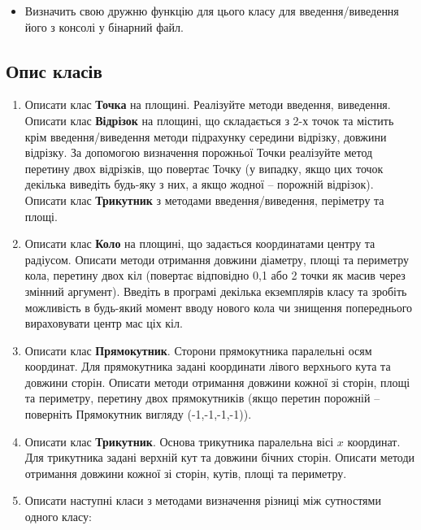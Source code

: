 \documentclass[]{article}
\begin{document}
\begin{itemize}
\item
  Визначить свою дружню функцію для цього класу для введення/виведення
  його з консолі у бінарний файл.
\end{itemize}


\subsection{ Опис класів}


\begin{enumerate}
\def\labelenumi{\arabic{enumi}.}
\item
  Описати клас \textbf{Точка} на
  площині. Реалізуйте методи введення, виведення. Описати клас
  \textbf{Відрізок} на площині, що складається з 2-х точок та містить
  крім введення/виведення методи підрахунку середини відрізку, довжини
  відрізку. За допомогою визначення порожньої Точки реалізуйте метод
  перетину двох відрізків, що повертає Точку (у випадку, якщо цих точок
  декілька виведіть будь-яку з них, а якщо жодної -- порожній відрізок).
  Описати клас \textbf{Трикутник} з методами введення/виведення,
  періметру та площі.
\item
  Описати клас \textbf{Коло} на площині, що задається координатами
  центру та радіусом. Описати методи отримання довжини діаметру, площі
  та периметру кола, перетину двох кіл (повертає відповідно 0,1 або 2
  точки як масив через змінний аргумент). Введіть в програмі декілька
  екземплярів класу та зробіть можливість в будь-який момент вводу
  нового кола чи знищення попереднього вираховувати центр мас ціх кіл.
\item
  Описати клас \textbf{Прямокутник}. Сторони прямокутника паралельні
  осям координат. Для прямокутника задані координати лівого верхнього
  кута та довжини сторін. Описати методи отримання довжини кожної зі
  сторін, площі та периметру, перетину двох прямокутників (якщо перетин
  порожній -- поверніть Прямокутник вигляду (-1,-1,-1,-1)).
\item
  Описати клас \textbf{Трикутник}. Основа трикутника паралельна вісі
  \(x\) координат. Для трикутника задані верхній кут та довжини бічних
  сторін. Описати методи отримання довжини кожної зі сторін, кутів,
  площі та периметру.
\item
  Описати наступні класи з методами визначення різниці між сутностями
  одного класу:


\end{enumerate}
\end{document}
